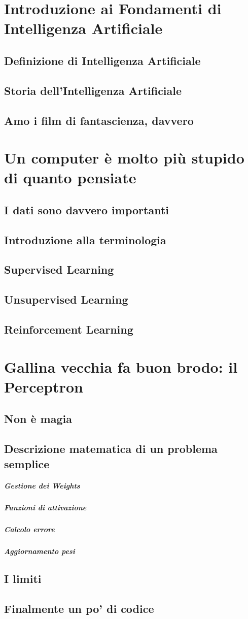 \documentclass[a4paper]{article}
\begin{document}
\section{Introduzione ai Fondamenti di Intelligenza Artificiale}
\subsection{Definizione di Intelligenza Artificiale}
\subsection{Storia dell'Intelligenza Artificiale}
\subsection{Amo i film di fantascienza, davvero}

\section{Un computer è molto più stupido di quanto pensiate}
\subsection{I dati sono davvero importanti}
\subsection{Introduzione alla terminologia}
\subsection{Supervised Learning}
\subsection{Unsupervised Learning}
\subsection{Reinforcement Learning}

\section{Gallina vecchia fa buon brodo: il Perceptron}
\subsection{Non è magia}
\subsection{Descrizione matematica di un problema semplice}
\subparagraph{Gestione dei Weights}
\subparagraph{Funzioni di attivazione}
\subparagraph{Calcolo errore}
\subparagraph{Aggiornamento pesi}
\subsection{I limiti}
\subsection{Finalmente un po' di codice}
\end{document}

